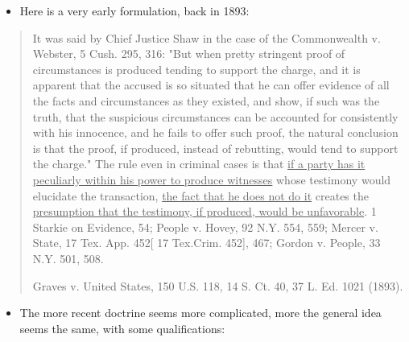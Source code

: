 \documentclass[
  10pt,
  dvipsnames,enabledeprecatedfontcommands]{scrartcl}
\providecommand{\tightlist}{%
  \setlength{\itemsep}{0pt}\setlength{\parskip}{0pt}}
\begin{document}
\begin{itemize}
\tightlist
\item
  Here is a very early formulation, back in 1893:
\end{itemize}

\begin{quote}
It was said by Chief Justice Shaw in the case of the Commonwealth v. Webster, 5 Cush. 295, 316: "But when pretty stringent proof of circumstances is produced tending to support the charge, and it is apparent that the accused is so situated that he can offer evidence of all the facts and circumstances as they existed, and show, if such was the truth, that the suspicious circumstances  can be accounted for consistently with his innocence, and he fails to offer such proof, the natural conclusion is that the proof, if produced, instead of rebutting, would tend to support the charge." The rule even in criminal cases is that \underline{if a party has it peculiarly within his power to produce witnesses} whose testimony would elucidate the transaction, \underline{the fact that he does not do it} creates the \underline{presumption that the testimony, if produced, would be unfavorable}. 1 Starkie on Evidence, 54; People v. Hovey, 92 N.Y. 554, 559; Mercer v. State, 17 Tex. App. 452[ 17 Tex.Crim. 452], 467; Gordon v. People, 33 N.Y. 501, 508.

Graves v. United States, 150 U.S. 118, 14 S. Ct. 40, 37 L. Ed. 1021 (1893).
\end{quote}


\begin{itemize}
\tightlist
\item
  The more recent doctrine seems more complicated, more the general idea
  seems the same, with some qualifications:
\end{itemize}
\end{document}

